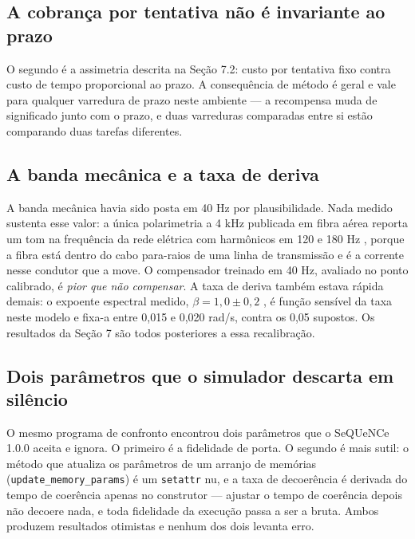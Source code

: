 \documentclass[12pt]{article}
\begin{document}
\subsection{A cobrança por tentativa não é invariante ao prazo}

O segundo é a assimetria descrita na Seção 7.2: custo por tentativa fixo contra
custo de tempo proporcional ao prazo. A consequência de método é geral e vale
para qualquer varredura de prazo neste ambiente --- a recompensa muda de
significado junto com o prazo, e duas varreduras comparadas entre si estão
comparando duas tarefas diferentes.

\subsection{A banda mecânica e a taxa de deriva}

A banda mecânica havia sido posta em 40 Hz por plausibilidade. Nada medido
sustenta esse valor: a única polarimetria a 4 kHz publicada em fibra aérea
reporta um tom na frequência da rede elétrica com harmônicos em 120 e 180 Hz
\cite{peterson2004}, porque a fibra está dentro do cabo para-raios de uma linha
de transmissão e é a corrente nesse condutor que a move. O compensador treinado
em 40 Hz, avaliado no ponto calibrado, é \emph{pior que não compensar}. A taxa
de deriva também estava rápida demais: o expoente espectral medido,
$\beta = 1{,}0 \pm 0{,}2$ \cite{ramaswamy2026}, é função sensível da taxa neste
modelo e fixa-a entre 0,015 e 0,020 rad/s, contra os 0,05 supostos. Os
resultados da Seção 7 são todos posteriores a essa recalibração.

\subsection{Dois parâmetros que o simulador descarta em silêncio}

O mesmo programa de confronto encontrou dois parâmetros que o SeQUeNCe 1.0.0
aceita e ignora. O primeiro é a fidelidade de porta. O segundo é mais sutil:
o método que atualiza os parâmetros de um arranjo de memórias
(\texttt{update\_memory\_params}) é um \texttt{setattr} nu, e a taxa de
decoerência é derivada do tempo de coerência apenas no construtor --- ajustar o tempo de coerência depois não decoere nada, e toda
fidelidade da execução passa a ser a bruta. Ambos produzem resultados
otimistas e nenhum dos dois levanta erro.

\end{document}

